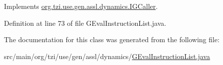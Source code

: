 Implements \hyperlink{interfaceorg_1_1tzi_1_1use_1_1gen_1_1assl_1_1dynamics_1_1_i_g_caller_a8dc6abb36ee44d8e73a0b506764bd1e1}{org.\-tzi.\-use.\-gen.\-assl.\-dynamics.\-I\-G\-Caller}.



Definition at line 73 of file G\-Eval\-Instruction\-List.\-java.



The documentation for this class was generated from the following file\-:\begin{DoxyCompactItemize}
\item 
src/main/org/tzi/use/gen/assl/dynamics/\hyperlink{_g_eval_instruction_list_8java}{G\-Eval\-Instruction\-List.\-java}\end{DoxyCompactItemize}

